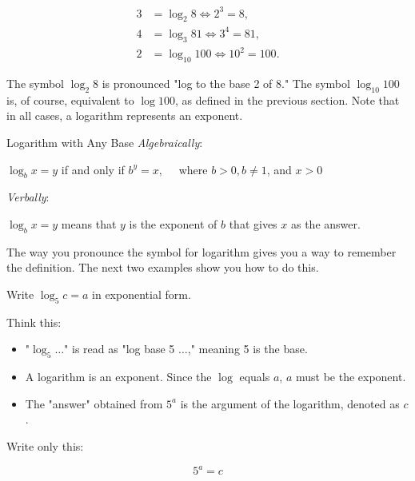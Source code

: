 \[
\begin{aligned}
3 &= \log_2 8 \Leftrightarrow 2^3 = 8, \\
4 &= \log_3 81 \Leftrightarrow 3^4 = 81, \\
2 &= \log_{10} 100 \Leftrightarrow 10^2 = 100.
\end{aligned}
\]

The symbol \(\log_2 8\) is pronounced "log to the base 2 of 8." The symbol \(\log_{10} 100\) is, of course, equivalent to \(\log 100\), as defined in the previous section. Note that in all cases, a logarithm represents an exponent.

\begin{definition}{Logarithm with Any Base}
\textit{Algebraically}:

\hspace{1cm}$\log _b x=y$ if and only if $b^y=x, \quad$ where $b>0, b \neq 1$, and $x>0$

\vspace{0.3cm}

\textit{Verbally}:

\hspace{1cm} $\log _b x=y$ means that $y$ is the exponent of $b$ that gives $x$ as the answer.
    
\end{definition}

The way you pronounce the symbol for logarithm gives you a way to remember the definition. The next two examples show you how to do this.

\begin{example} Write $\log _5 c=a$ in exponential form.

\begin{solution}

Think this:
\begin{itemize}
    \item "\(\log_5 \ldots\)" is read as "log base 5 \(\ldots\)," meaning 5 is the base.
    \item A logarithm is an exponent. Since the \(\log\) equals \(a\), \(a\) must be the exponent.
    \item The "answer" obtained from \(5^a\) is the argument of the logarithm, denoted as \(c\).
\end{itemize}

Write only this: 

\[
5^a = c
\]
\end{solution}
\end{example}

